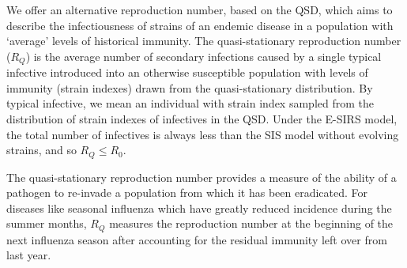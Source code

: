\documentclass[smallextended]{svjour3}       %
\begin{document}
We offer an alternative reproduction number, based on the QSD, which aims to describe the infectiousness of strains of an endemic disease in a population with `average' levels of historical immunity. The quasi-stationary reproduction number ($R_Q$) is the average number of secondary infections caused by a single typical infective introduced into an otherwise susceptible population with levels of immunity (strain indexes) drawn from the quasi-stationary distribution. By typical infective, we mean an individual with strain index sampled from the distribution of strain indexes of infectives in the QSD. Under the E-SIRS model, the total number of infectives is always less than the SIS model without evolving strains, and so $R_Q\leq R_0$.

The quasi-stationary reproduction number provides a measure of the ability of a pathogen to re-invade a population from which it has been eradicated. For diseases like seasonal influenza which have greatly reduced incidence during the summer months, $R_Q$ measures the reproduction number at the beginning of the next influenza season after accounting for the residual immunity left over from last year.
\end{document}
